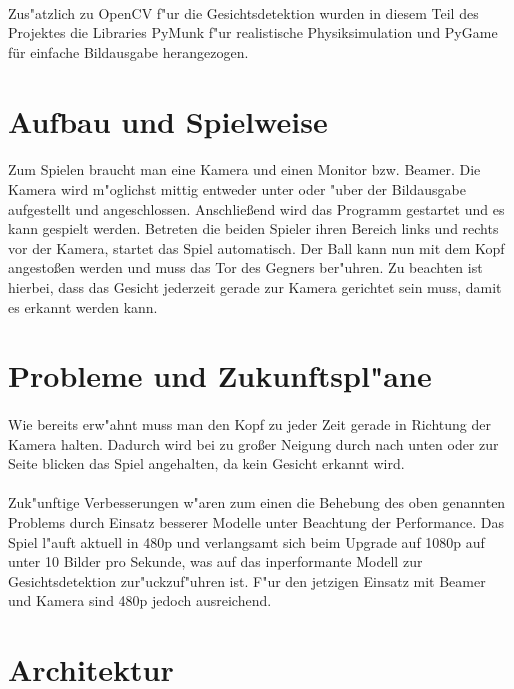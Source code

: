 \documentclass[12pt]{article}
\begin{document}
\paragraph{}
Zus"atzlich zu OpenCV f"ur die Gesichtsdetektion wurden in diesem Teil des Projektes
die Libraries PyMunk f"ur realistische Physiksimulation und PyGame für einfache Bildausgabe
herangezogen.
\section{Aufbau und Spielweise}
\paragraph{}
Zum Spielen braucht man eine Kamera und einen Monitor bzw. Beamer. Die Kamera
wird m"oglichst mittig entweder unter oder "uber der Bildausgabe aufgestellt und angeschlossen.
Anschließend wird das Programm gestartet und es kann gespielt werden.
Betreten die beiden Spieler ihren Bereich links und rechts vor der Kamera,
startet das Spiel automatisch. Der Ball kann nun mit dem Kopf angestoßen werden
und muss das Tor des Gegners ber"uhren. Zu beachten ist hierbei, dass
das Gesicht jederzeit gerade zur Kamera gerichtet sein muss, damit es erkannt werden kann.
\section{Probleme und Zukunftspl"ane}
\paragraph{}
Wie bereits erw"ahnt muss man den Kopf zu jeder Zeit gerade in Richtung
der Kamera halten. Dadurch wird bei zu großer Neigung durch nach unten oder zur
Seite blicken das Spiel angehalten, da kein Gesicht erkannt wird.
\paragraph{}
Zuk"unftige Verbesserungen w"aren zum einen die Behebung des oben genannten Problems
durch Einsatz besserer Modelle unter Beachtung der Performance. Das Spiel l"auft aktuell
in 480p und verlangsamt sich beim Upgrade auf 1080p auf unter 10 Bilder pro Sekunde,
was auf das inperformante Modell zur Gesichtsdetektion zur"uckzuf"uhren ist.
F"ur den jetzigen Einsatz mit Beamer und Kamera sind 480p jedoch ausreichend.
\section{Architektur}
\end{document}
